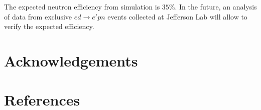 \documentclass[3p,final,twocolumn]{elsarticle}
\begin{document}
The expected neutron efficiency from simulation is $35$\%. In the future, an analysis of data from exclusive $ed \rightarrow e'pn$ events collected at Jefferson Lab will allow to verify the expected efficiency.


\section{Acknowledgements}



\section*{References}



 
\end{document}

